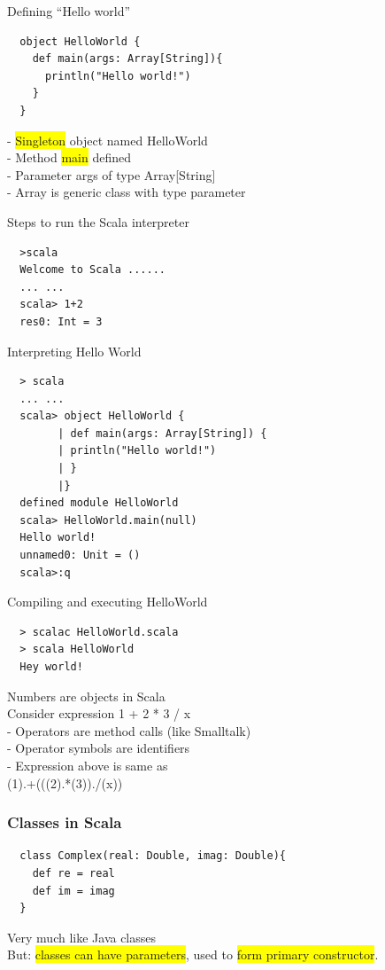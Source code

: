 \documentclass[tikz,border=10pt]{project_plan}
\begin{document}
Defining “Hello world”
\begin{lstlisting}
  object HelloWorld {
    def main(args: Array[String]){
      println("Hello world!")
    }
  }
\end{lstlisting}
-  \colorbox{yellow}{Singleton} object named HelloWorld\\
-  Method \colorbox{yellow}{main} defined\\
-  Parameter args of type Array[String]\\
-  Array is generic class with type parameter

Steps to run the Scala interpreter
\begin{lstlisting}
  >scala
  Welcome to Scala ......
  ... ...
  scala> 1+2
  res0: Int = 3
\end{lstlisting}

Interpreting Hello World
\begin{lstlisting}
  > scala
  ... ...
  scala> object HelloWorld {
        | def main(args: Array[String]) {
        | println("Hello world!")
        | }
        |}
  defined module HelloWorld
  scala> HelloWorld.main(null)
  Hello world!
  unnamed0: Unit = ()
  scala>:q
\end{lstlisting}

Compiling and executing HelloWorld
\begin{lstlisting}
  > scalac HelloWorld.scala
  > scala HelloWorld
  Hey world!
\end{lstlisting}

Numbers are objects in Scala\\
Consider expression 1 + 2 * 3 / x\\
- Operators are method calls (like Smalltalk)\\
- Operator symbols are identifiers\\
- Expression above is same as\\
(1).+(((2).*(3))./(x))

\subsubsection{Classes in Scala}

\begin{lstlisting}
  class Complex(real: Double, imag: Double){
    def re = real
    def im = imag
  }
\end{lstlisting}
Very much like Java classes\\
But: \colorbox{yellow}{classes can have parameters}, used to \colorbox{yellow}{form primary constructor}.
\end{document}
